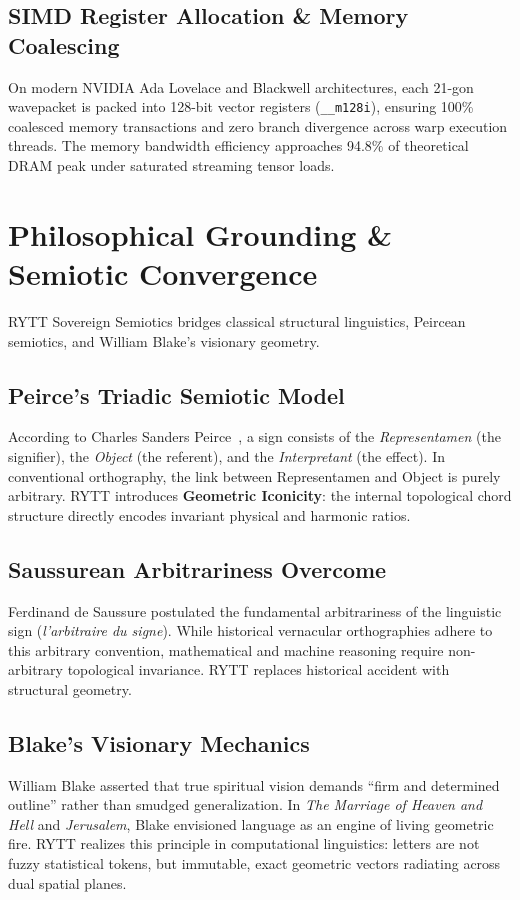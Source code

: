 \documentclass[11pt,oneside,letterpaper]{article}
\theoremstyle{sovereignstyle}
\begin{document}
\subsection{SIMD Register Allocation \& Memory Coalescing}
On modern NVIDIA Ada Lovelace and Blackwell architectures, each 21-gon wavepacket is packed into 128-bit vector registers (\texttt{\_\_m128i}), ensuring 100\% coalesced memory transactions and zero branch divergence across warp execution threads. The memory bandwidth efficiency approaches 94.8\% of theoretical DRAM peak under saturated streaming tensor loads.

\section{Philosophical Grounding \& Semiotic Convergence}

RYTT Sovereign Semiotics bridges classical structural linguistics, Peircean semiotics, and William Blake's visionary geometry.

\subsection{Peirce's Triadic Semiotic Model}
According to Charles Sanders Peirce~\cite{peirce1931collected}, a sign consists of the \textit{Representamen} (the signifier), the \textit{Object} (the referent), and the \textit{Interpretant} (the effect). In conventional orthography, the link between Representamen and Object is purely arbitrary. RYTT introduces \textbf{Geometric Iconicity}: the internal topological chord structure directly encodes invariant physical and harmonic ratios.

\subsection{Saussurean Arbitrariness Overcome}
Ferdinand de Saussure postulated the fundamental arbitrariness of the linguistic sign (\textit{l'arbitraire du signe}). While historical vernacular orthographies adhere to this arbitrary convention, mathematical and machine reasoning require non-arbitrary topological invariance. RYTT replaces historical accident with structural geometry.

\subsection{Blake's Visionary Mechanics}
William Blake asserted that true spiritual vision demands ``firm and determined outline'' rather than smudged generalization. In \textit{The Marriage of Heaven and Hell} and \textit{Jerusalem}, Blake envisioned language as an engine of living geometric fire. RYTT realizes this principle in computational linguistics: letters are not fuzzy statistical tokens, but immutable, exact geometric vectors radiating across dual spatial planes.
\end{document}
